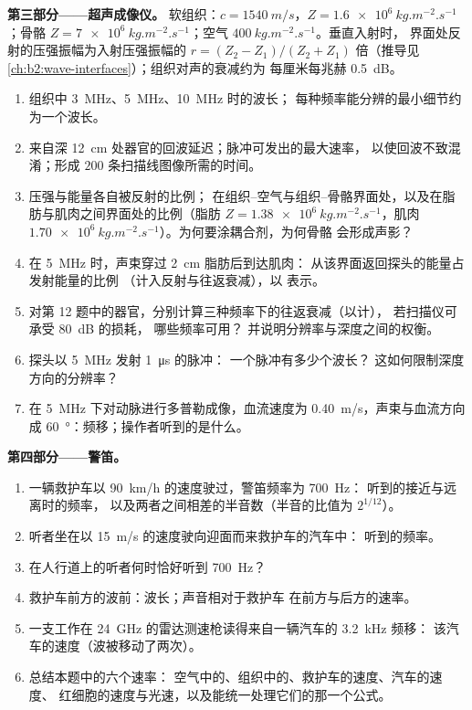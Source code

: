 \begin{problem}
\medskip
\noindent\textbf{第三部分——超声成像仪。}
软组织：$c = \qty{1540}{m/s}$，$Z = \qty{1.6e6}{kg.m^{-2}.s^{-1}}$；骨骼
$Z = \qty{7e6}{kg.m^{-2}.s^{-1}}$；空气 $\qty{400}{kg.m^{-2}.s^{-1}}$。垂直入射时，
界面处反射的压强振幅为入射压强振幅的 $r = (Z_2 -
Z_1)/(Z_2 + Z_1)$ 倍（推导见
\cref{ch:b2:wave-interfaces}）；组织对声的衰减约为
每厘米每兆赫 \qty{0.5}{dB}。
\begin{enumerate}[resume]
  \item 组织中 \qty{3}{MHz}、\qty{5}{MHz}、\qty{10}{MHz} 时的波长；
        每种频率能分辨的最小细节约为一个波长。
  \item 来自深 \qty{12}{cm} 处器官的回波延迟；脉冲可发出的最大速率，
        以使回波不致混淆；形成
        $200$ 条扫描线图像所需的时间。
  \item 压强与能量各自被反射的比例；
        在组织–空气与组织–骨骼界面处，以及在脂肪与肌肉之间界面处的比例（脂肪
        $Z = \qty{1.38e6}{kg.m^{-2}.s^{-1}}$，肌肉
        $\qty{1.70e6}{kg.m^{-2}.s^{-1}}$）。为何要涂耦合剂，为何骨骼
        会形成声影？
  \item 在 \qty{5}{MHz} 时，声束穿过 \qty{2}{cm} 脂肪后到达肌肉：
        从该界面返回探头的能量占发射能量的比例
        （计入反射与往返衰减），以
        表示。
  \item 对第 12 题中的器官，分别计算三种频率下的往返衰减（以计），
        若扫描仪可承受 \qty{80}{dB} 的损耗，
        哪些频率可用？
        并说明分辨率与深度之间的权衡。
  \item 探头以 \qty{5}{MHz} 发射 \qty{1}{\micro s} 的脉冲：
        一个脉冲有多少个波长？
        这如何限制深度方向的分辨率？
  \item 在 \qty{5}{MHz} 下对动脉进行多普勒成像，血流速度为 \qty{0.40}{m/s}，声束与血流方向成
        \qty{60}{\degree}：频移；操作者听到的是什么。
\end{enumerate}

\medskip
\noindent\textbf{第四部分——警笛。}
\begin{enumerate}[resume]
  \item 一辆救护车以 \qty{90}{km/h} 的速度驶过，警笛频率为 \qty{700}{Hz}：
        听到的接近与远离时的频率，
        以及两者之间相差的半音数（半音的比值为 $2^{1/12}$）。
  \item 听者坐在以 \qty{15}{m/s} 的速度驶向迎面而来救护车的汽车中：
        听到的频率。
  \item 在人行道上的听者何时恰好听到
        \qty{700}{Hz}？
  \item 救护车前方的波前：波长；声音相对于救护车
        在前方与后方的速率。
  \item 一支工作在 \qty{24}{GHz} 的雷达测速枪读得来自一辆汽车的 \qty{3.2}{kHz} 频移：
        该汽车的速度（波被移动了两次）。
  \item 总结本题中的六个速率：
        空气中的、组织中的、救护车的速度、汽车的速度、
        红细胞的速度与光速，以及能统一处理它们的那一个公式。
\end{enumerate}
\end{problem}
